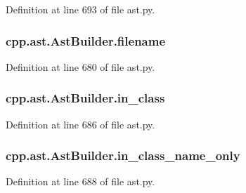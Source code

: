 Definition at line 693 of file ast.\+py.

\subsubsection[{\texorpdfstring{filename}{filename}}]{\setlength{\rightskip}{0pt plus 5cm}cpp.\+ast.\+Ast\+Builder.\+filename}\hypertarget{classcpp_1_1ast_1_1_ast_builder_ad8b8f5788de55d6c7151e82af8b21115}{}\label{classcpp_1_1ast_1_1_ast_builder_ad8b8f5788de55d6c7151e82af8b21115}


Definition at line 680 of file ast.\+py.

\subsubsection[{\texorpdfstring{in\+\_\+class}{in_class}}]{\setlength{\rightskip}{0pt plus 5cm}cpp.\+ast.\+Ast\+Builder.\+in\+\_\+class}\hypertarget{classcpp_1_1ast_1_1_ast_builder_a9edc1e10a3f005b463fd9316d83dd15d}{}\label{classcpp_1_1ast_1_1_ast_builder_a9edc1e10a3f005b463fd9316d83dd15d}


Definition at line 686 of file ast.\+py.

\subsubsection[{\texorpdfstring{in\+\_\+class\+\_\+name\+\_\+only}{in_class_name_only}}]{\setlength{\rightskip}{0pt plus 5cm}cpp.\+ast.\+Ast\+Builder.\+in\+\_\+class\+\_\+name\+\_\+only}\hypertarget{classcpp_1_1ast_1_1_ast_builder_a376583354ab9afa308b7f34105bf3f4a}{}\label{classcpp_1_1ast_1_1_ast_builder_a376583354ab9afa308b7f34105bf3f4a}


Definition at line 688 of file ast.\+py.

